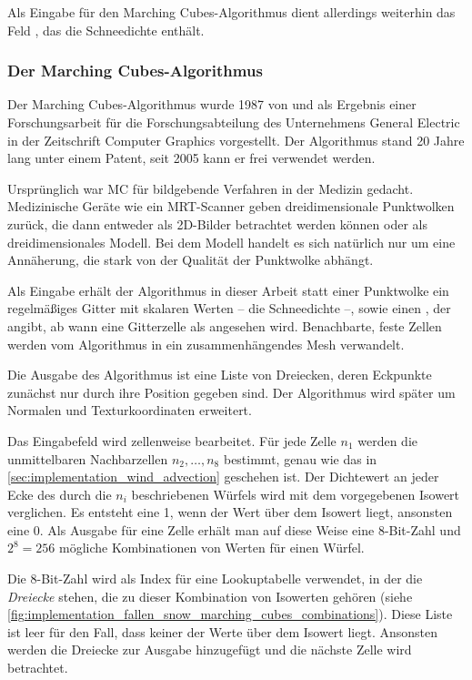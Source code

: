 Als Eingabe für den Marching Cubes-Algorithmus dient allerdings
weiterhin das Feld , das die
Schneedichte enthält.

\subsubsection{Der Marching Cubes-Algorithmus}

Der Marching Cubes-Algorithmus wurde 1987 von
 und 
als Ergebnis einer Forschungsarbeit für die Forschungsabteilung des
Unternehmens General Electric in der Zeitschrift Computer Graphics
vorgestellt\cite{Lorensen:1987:MCH:37402.37422}. Der Algorithmus stand
20 Jahre lang unter einem Patent, seit 2005 kann er frei verwendet
werden.

Ursprünglich war MC für bildgebende Verfahren in der Medizin
gedacht. Medizinische Geräte wie ein MRT-Scanner geben
dreidimensionale Punktwolken zurück, die dann entweder
 als 2D-Bilder betrachtet werden können
oder als dreidimensionales Modell. Bei dem Modell handelt es sich
natürlich nur um eine Annäherung, die stark von der Qualität der
Punktwolke abhängt.

Als Eingabe erhält der Algorithmus in dieser Arbeit statt einer
Punktwolke ein regelmäßiges Gitter mit skalaren Werten -- \PimiddyzB
die Schneedichte --, sowie einen , der angibt,
ab wann eine Gitterzelle als  angesehen wird.
Benachbarte, feste Zellen werden vom Algorithmus in ein
zusammenhängendes Mesh verwandelt.

Die Ausgabe des Algorithmus ist eine Liste von Dreiecken, deren
Eckpunkte zunächst nur durch ihre Position gegeben sind. Der
Algorithmus wird später um Normalen und Texturkoordinaten erweitert.

Das Eingabefeld wird zellenweise bearbeitet. Für jede Zelle $n_1$
werden die unmittelbaren Nachbarzellen $n_2,\ldots,n_8$ bestimmt,
genau wie das in \autoref{sec:implementation_wind_advection} geschehen
ist. Der Dichtewert an jeder Ecke des durch die $n_i$ beschriebenen
Würfels wird mit dem vorgegebenen Isowert verglichen. Es entsteht eine
1, wenn der Wert über dem Isowert liegt, ansonsten eine 0. Als Ausgabe
für eine Zelle erhält man auf diese Weise eine 8-Bit-Zahl und
$2^8=256$ mögliche Kombinationen von Werten für einen Würfel.

Die 8-Bit-Zahl wird als Index für eine Lookuptabelle verwendet, in der
die \emph{Dreiecke} stehen, die zu dieser Kombination von Isowerten
gehören (siehe
\autoref{fig:implementation_fallen_snow_marching_cubes_combinations}). Diese
Liste ist leer für den Fall, dass keiner der Werte über dem Isowert
liegt. Ansonsten werden die Dreiecke zur Ausgabe hinzugefügt und die
nächste Zelle wird betrachtet.

